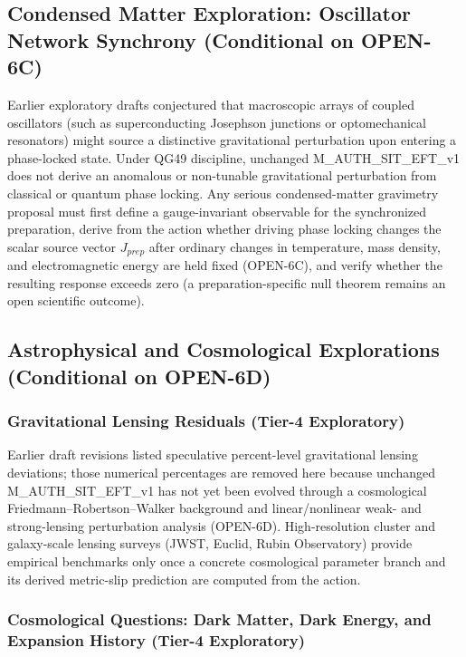 \documentclass[american,11pt,letterpaper]{article}
\def\mathrm#1{#1}%
\def\texttt#1{#1}%
\def\emph#1{#1}%
\begin{document}
\subsection{Condensed Matter Exploration: Oscillator Network Synchrony (Conditional on \texttt{OPEN-6C})}

Earlier exploratory drafts conjectured that macroscopic arrays of coupled oscillators (such as superconducting Josephson junctions or optomechanical resonators) might source a distinctive gravitational perturbation upon entering a phase-locked state. Under \texttt{QG49} discipline, unchanged \texttt{M\_AUTH\_SIT\_EFT\_v1} does \emph{not} derive an anomalous or non-tunable gravitational perturbation from classical or quantum phase locking. Any serious condensed-matter gravimetry proposal must first define a gauge-invariant observable for the synchronized preparation, derive from the action whether driving phase locking changes the scalar source vector $J_{\mathrm{prep}}$ after ordinary changes in temperature, mass density, and electromagnetic energy are held fixed (\texttt{OPEN-6C}), and verify whether the resulting response exceeds zero (a preparation-specific null theorem remains an open scientific outcome).

\subsection{Astrophysical and Cosmological Explorations (Conditional on \texttt{OPEN-6D})}
\label{sec:part2-astro-probes}
\subsubsection{Gravitational Lensing Residuals (Tier-4 Exploratory)}

Earlier draft revisions listed speculative percent-level gravitational lensing deviations; those numerical percentages are removed here because unchanged \texttt{M\_AUTH\_SIT\_EFT\_v1} has not yet been evolved through a cosmological Friedmann--Robertson--Walker background and linear/nonlinear weak- and strong-lensing perturbation analysis (\texttt{OPEN-6D}). High-resolution cluster and galaxy-scale lensing surveys (JWST, Euclid, Rubin Observatory) provide empirical benchmarks only once a concrete cosmological parameter branch and its derived metric-slip prediction are computed from the action.

\subsubsection{Cosmological Questions: Dark Matter, Dark Energy, and Expansion History (Tier-4 Exploratory)}
\end{document}
